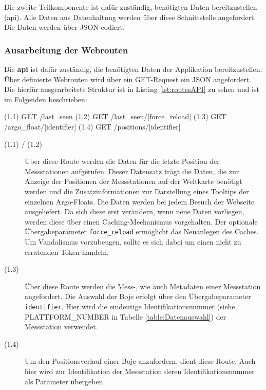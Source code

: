 Die zweite Teilkomponente ist dafür zuständig, benötigten Daten bereitzustellen (api). Alle Daten aus Datenhaltung werden über diese Schnittstelle angefordert. Die Daten werden über JSON codiert.


\subsubsection{Ausarbeitung der Webrouten} \label{sec:entwurfRoutes}


Die \textbf{api} ist dafür zuständig, die benötigten Daten der Applikation bereitzustellen. Über definierte Webrouten wird über ein GET-Request ein JSON angefordert. Die  hierfür ausgearbeitete Struktur ist in Listing \ref{lst:routesAPI} zu sehen und ist im Folgenden beschrieben:

\begin{python}[label={lst:routesAPI}, caption={Webrouten der API}]
(1.1) GET     /last_seen
(1.2) GET     /last_seen/[force_reload]
(1.3) GET     /argo_float/[identifier]
(1.4) GET     /positions/[identifier]
\end{python}

\begin{description}
 \item [(1.1) / (1.2)]
    Über diese Route  werden die Daten für die letzte Position der Messstationen aufgerufen. Dieser Datensatz trägt die Daten, die zur Anzeige der Positionen der Messstationen auf der Weltkarte benötigt werden und die Zusatzinformationen zur Darstellung eines Tooltips der einzelnen Argo-Floats. Die Daten werden bei jedem Besuch der Webseite ausgeliefert. Da sich diese erst verändern, wenn neue Daten vorliegen, werden diese über einen Caching-Mechanismus vorgehalten. Der optionale Übergabeparameter \texttt{force\_reload} ermöglicht das Neuanlegen des Caches. Um Vandalismus vorzubeugen, sollte es sich dabei um einen nicht zu  erratenden Token handeln.
    
 \item [(1.3)]
    Über diese Route werden die Mess-, wie auch Metadaten einer Messstation angefordert. Die Auswahl der Boje erfolgt über den Übergabeparameter \texttt{identifier}. Hier wird die eindeutige Identifikationsnummer (siehe PLATTFORM\_NUMBER in Tabelle \ref{table:Datenauswahl}) der Messstation verwendet.
    
 \item [(1.4)]
    Um den Positionsverlauf einer Boje anzufordern, dient diese Route. Auch hier wird zur Identifikation der Messstation deren Identifikationsnummer als Parameter übergeben. 
\end{description}



